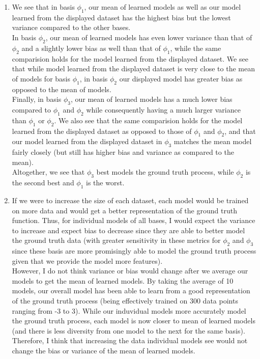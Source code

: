 \documentclass[submit]{harvardml}
\begin{document}
\begin{enumerate}
\begin{figure} [h!]
    \end{figure}
    \\ \\ \\ 
    \item We see that in basis $\phi_1$, our mean of learned models as well as our model learned from the displayed dataset has the highest bias but the lowest variance compared to the other bases. \\
    In basis $\phi_2$, our mean of learned models has even lower variance than that of $\phi_2$ and a slightly lower bias as well than that of $\phi_1$, while the same comparision holds for the model learned from the displayed dataset. We see that while model learned from the displayed dataset is very close to the mean of models for basis $\phi_1$, in basis $\phi_2$ our displayed model has greater bias as opposed to the mean of models. \\
    Finally, in basis $\phi_3$, our mean of learned models has a much lower bias compared to $\phi_1$ and $\phi_2$ while consequently having a much larger variance than $\phi_1$ or $\phi_2$. We also see that the same comparision holds for the model learned from the displayed dataset as opposed to those of $\phi_1$ and $\phi_2$, and that our model learned from the displayed dataset in $\phi_3$ matches the mean model fairly closely (but still has higher bias and variance as compared to the mean). \\
    Altogether, we see that $\phi_3$ best models the ground truth process, while $\phi_2$ is the second best and $\phi_1$ is the worst. 
    
    \item If we were to increase the size of each dataset, each model would be trained on more data and would get a better representation of the ground truth function. Thus, for individual models of all bases, I would expect the variance to increase and expect bias to decrease since they are able to better model the ground truth data (with greater sensitivity in these metrics for $\phi_2$ and $\phi_3$ since these basis are more promisingly able to model the ground truth process given that we provide the model more features). \\
    However, I do not think variance or bias would change after we average our models to get the mean of learned models. By taking the average of 10 models, our overall model has been able to learn from a good representation of the ground truth process (being effectively trained on 300 data points ranging from -3 to 3). While our induvidual models more accurately model the ground truth process, each model is now closer to mean of learned models (and there is less diversity from one model to the next for the same basis). Therefore, I think that increasing the data individual models see would not change the bias or variance of the mean of learned models.

\end{enumerate}
\end{document}
